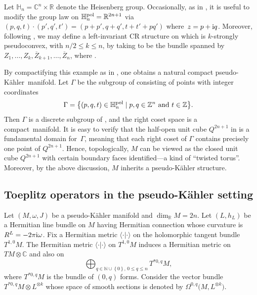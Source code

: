 \documentclass[10pt,a4paper]{amsart}
\numberwithin{equation}{section}
\newcommand{\set}[1]{\left\{#1\right\}}
\begin{document}
	 \begin{Example}
	 	Let $\mathbb{H}_n = \mathbb{C}^n \times \mathbb{R}$ denote the Heisenberg group. Occasionally, as in \cite{f}, it is useful to modify the group law on $\mathbb{H}_n^{{\rm pol}} = \mathbb{R}^{2n+1}$ via
	 	$(p, q, t)\cdot (p', q', t')=(p+p', q+q', t+t'+pq')$
	 	where~${z=p+{\rm i} q}$. Moreover, following \cite[pp.~436--437]{fs}, we may define a left-invariant CR structure on  which is $k$-strongly pseudoconvex, with $n/2 \leq k \leq n$, by taking  to be the bundle spanned by
	 	$Z_1, \dots, Z_k, \overline{Z}_{k+1}, \dots, \overline{Z}_n $,
	 	where
	 	.
	 	
	 	By compactifying this example as in \cite[p. 68]{f}, one obtains a natural compact pseudo-K\"ahler~manifold. Let $\Gamma$ be the subgroup of  consisting of points with integer coordinates
	 	\[\Gamma =\big\{(p, q, t)\in \mathbb{H}^{\rm pol}_n \mid p, q\in \mathbb{Z}^n\text{ and }t\in \mathbb{Z} \big\} . \]
	 	Then $\Gamma$ is a discrete subgroup of , and the right coset space  is a compact~mani\-fold. It is easy to verify that the half-open unit cube $Q^{2n+1}$ in  is a fundamental domain for~$\Gamma$, meaning that each right coset of $\Gamma$ contains precisely one point of $Q^{2n+1}$. Hence, topologically, $M$ can be viewed as the closed unit cube $Q^{2n+1}$ with certain boundary faces identified—a kind of ``twisted torus''. Moreover, by the above discussion, $M$ inherits a pseudo-K\"ahler structure. \end{Example}
	
	 \subsection{Toeplitz operators in the pseudo-K\"ahler setting}
	
Let $(M, \omega, J)$ be a {pseudo-K\"ahler manifold} and $\dim_{\mathbb{R}}M=2n$. Let $(L, h_L)$ be a Hermitian line bundle on $M$ having Hermitian connection whose curvature is $R^L=-2\pi {\rm i} \omega$. Fix a Hermitian metric $\langle \cdot | \cdot \rangle$ on the holomorphic tangent bundle $T^{1,0}M$. The Hermitian metric $\langle \cdot | \cdot \rangle$ on $T^{1,0}M$ induces a Hermitian metric on $TM\otimes\mathbb C$ and also on
 \[
 \bigoplus_{q\in\mathbb N\cup\set{0},\,0\leq q\leq n}T^{*0,q}M,
\]
 where $T^{*0,q}M$ is the bundle of $(0,q)$ forms. Consider the vector bundle $T^{*0,q}M\otimes L^{\otimes k}$ whose space of smooth sections is denoted by $\Omega^{0,q}\bigl(M,L^{\otimes k}\bigr)$.
	 	
\end{document}
